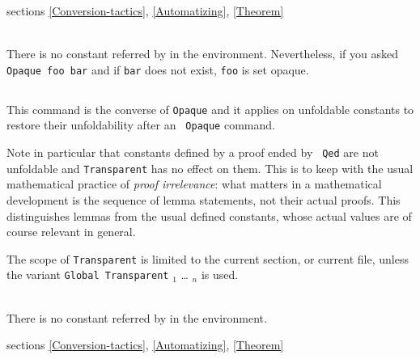 \SeeAlso sections \ref{Conversion-tactics}, \ref{Automatizing},
\ref{Theorem}

\begin{ErrMsgs}
\item {}\\
    There is no constant referred by {\qualid} in the environment.
    Nevertheless, if you asked \texttt{Opaque foo bar}
    and if \texttt{bar} does not exist, \texttt{foo} is set opaque.
\end{ErrMsgs}

\subsection[{\tt Transparent} \qualid$_1$ {\ldots} \qualid$_n${\tt .}]{{}\label{Transparent}}
This command is the converse of {\tt Opaque} and it applies on
unfoldable constants to restore their unfoldability after an {\tt
Opaque} command.

Note in particular that constants defined by a proof ended by {\tt
Qed} are not unfoldable and {\tt Transparent} has no effect on
them. This is to keep with the usual mathematical practice of {\em
proof irrelevance}: what matters in a mathematical development is the
sequence of lemma statements, not their actual proofs. This
distinguishes lemmas from the usual defined constants, whose actual
values are of course relevant in general.

The scope of {\tt Transparent} is limited to the current section, or
current file, unless the variant {\tt Global Transparent} \qualid$_1$
{\ldots} \qualid$_n$ is used.

\begin{ErrMsgs}
\item {}\\
    There is no constant referred by {\qualid} in the environment.
\end{ErrMsgs}

\SeeAlso sections \ref{Conversion-tactics}, \ref{Automatizing},
\ref{Theorem}

